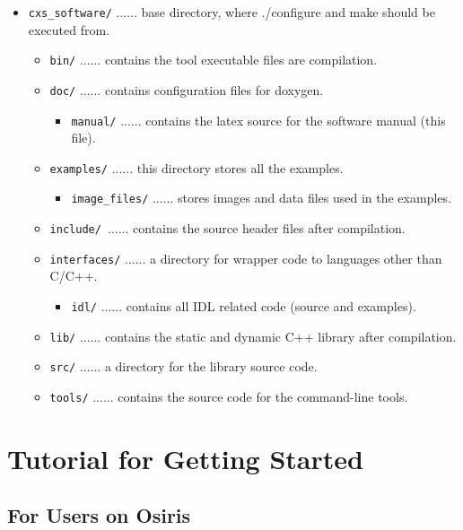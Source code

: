 \documentclass[]{cxs-software}
\begin{document}
\begin{itemize}
   \item[] {\tt cxs\_software/} ...... base directory, where ./configure and make should be executed from.
   \begin{itemize}
      \item[] {\tt bin/} ...... contains the tool executable files are compilation.
      \item[] {\tt doc/} ...... contains configuration files for doxygen.
      \begin{itemize}
         \item[] {\tt manual/} ...... contains the latex source for the software manual (this file).
      \end{itemize}
      \item[] {\tt examples/} ...... this directory stores all the examples.
      \begin{itemize}
         \item[] {\tt image\_files/} ...... stores images and data files used in the examples.
      \end{itemize}
      \item[] {\tt include/ }...... contains the source header files after compilation.
      \item[] {\tt interfaces/} ...... a directory for wrapper code to languages other than C/C++.
      \begin{itemize}
         \item[] {\tt idl/} ...... contains all IDL related code (source and examples).
      \end{itemize}
      \item[] {\tt lib/} ...... contains the static and dynamic C++ library after compilation.
      \item[] {\tt src/} ...... a directory for the library source code.
      \item[] {\tt tools/} ...... contains the source code for the command-line tools.
   \end{itemize}
\end{itemize}

\newpage

\section{Tutorial for Getting Started}
\label{getting started}

\subsection{For Users on Osiris}
\end{document}
